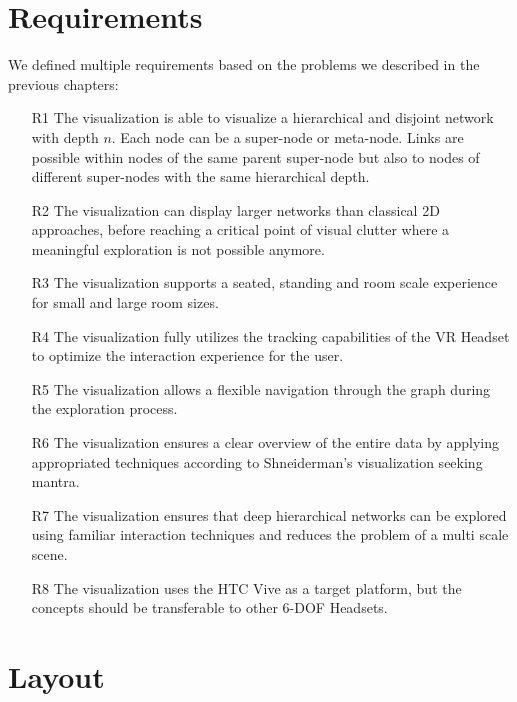 \section{Requirements}
\label{chap:ps-requirements}
We defined multiple requirements based on the problems we described in the previous chapters:\\
\begin{enumerate}
    \item[R1]\label{req:R1} The visualization is able to visualize a hierarchical and disjoint network with depth $n$. Each node can be a super-node or meta-node. Links are possible within nodes of the same parent super-node but also to nodes of different super-nodes with the same hierarchical depth.
    \item[R2]\label{req:R2} The visualization can display larger networks than classical 2D approaches, before reaching a critical point of visual clutter where a meaningful exploration is not possible anymore.
    \item[R3]\label{req:R3} The visualization supports a seated, standing and room scale experience for small and large room sizes.
    \item[R4]\label{req:R4} The visualization fully utilizes the tracking capabilities of the VR Headset to optimize the interaction experience for the user.
    \item[R5]\label{req:R5} The visualization allows a flexible navigation through the graph during the exploration process.
    \item[R6]\label{req:R6} The visualization ensures a clear overview of the entire data by applying appropriated techniques according to Shneiderman's visualization seeking mantra.
    \item[R7]\label{req:R7} The visualization ensures that deep hierarchical networks can be explored using familiar interaction techniques and reduces the problem of a multi scale scene.
    \item[R8]\label{req:R8} The visualization uses the HTC Vive as a target platform, but the concepts should be transferable to other 6-DOF Headsets. 
\end{enumerate}

\section{Layout}
\label{chap:ps-layout}

